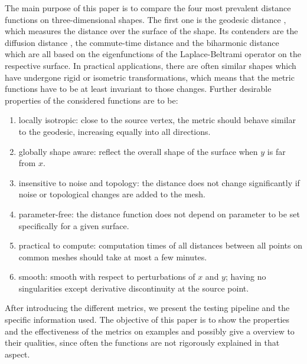 The main purpose of this paper is to compare the four most prevalent distance functions on three-dimensional shapes.
The first one is the geodesic distance \cite{surazhsky2005fast,kimmel1998computing}, which measures the distance over the surface of the shape.
Its contenders are the diffusion distance \cite{sun2009concise}, the commute-time distance \cite{fouss2007random,lipman2010biharmonic} and the biharmonic distance \cite{lipman2010biharmonic} which are all based on the eigenfunctions of the Laplace-Beltrami operator on the respective surface.
In practical applications, there are often similar shapes which have undergone rigid or isometric transformations, which means that the metric functions have to be at least invariant to those changes.
Further desirable properties of the considered functions are to be:
\begin{enumerate}
	\item locally isotropic: close to the source vertex, the metric should behave similar to the geodesic, increasing equally into all directions.
	\item globally shape aware: reflect the overall shape of the surface when $y$ is far from $x$.
	\item insensitive to noise and topology: the distance does not change significantly if noise or topological changes are added to the mesh.
	\item parameter-free: the distance function does not depend on parameter to be set specifically for a given surface.
	\item practical to compute: computation times of all distances between all points on common meshes should take at most a few minutes.
	\item smooth: smooth with respect to perturbations of $x$ and $y$; having no singularities except derivative discontinuity at the source point.
\end{enumerate}

After introducing the different metrics, we present the testing pipeline and the specific information used.
The objective of this paper is to show the properties and the effectiveness of the metrics on examples and possibly give a overview to their qualities, since often the functions are not rigorously explained in that aspect.

